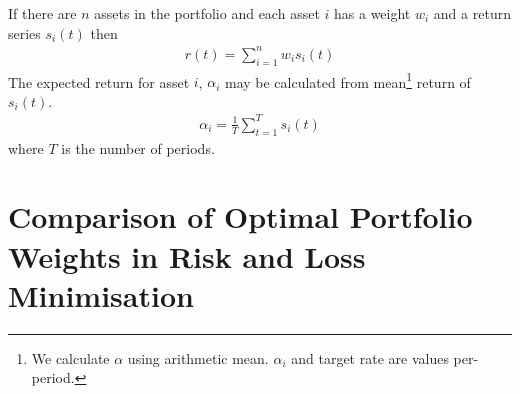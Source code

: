 \documentclass[12pt]{article}
\begin{document}
If there are $n$ assets in the portfolio and each asset $i$
has a weight $w_i$ and a return series $s_i (t)$ then
\begin{eqnarray}
    r(t) = \sum_{i=1}^{n} w_i s_i(t)
\end{eqnarray}
The expected return for asset $i$, $\alpha_i$ may be calculated from
mean\footnote{We calculate $\alpha$ using arithmetic mean. $\alpha_i$ and target rate are values per-period.} 
return of $s_i(t)$.
\begin{eqnarray}
    \alpha_i =  \frac{1}{T}\sum_{t=1}^{T} s_i(t)
\end{eqnarray}
where $T$ is the number of periods.

\section{Comparison of Optimal Portfolio Weights in Risk and Loss Minimisation}
\end{document}
